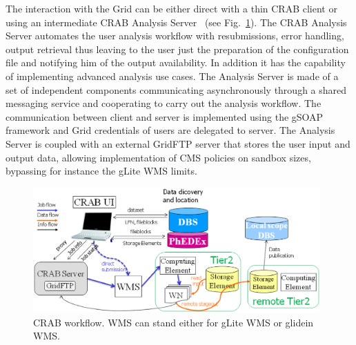 The interaction with the Grid can be either direct with a thin CRAB client or using an intermediate CRAB Analysis Server~\cite{RefCRAB} (see Fig.~\ref{fig:CRABWorkflow}). The CRAB Analysis Server automates the user analysis workflow with resubmissions, error handling, output retrieval thus leaving to the user just the preparation of the configuration file and notifying him of the output availability. In addition it has the capability of implementing advanced analysis use cases.
The Analysis Server is made of a set of independent components communicating asynchronously through a shared messaging service and cooperating to carry out the analysis workflow. The communication between client and server is implemented using the gSOAP framework and Grid credentials of users are delegated to server.
The Analysis Server is coupled with an external GridFTP server %
 that stores the user input and output data, allowing implementation of CMS policies on sandbox sizes, bypassing for instance the gLite WMS limits.


\begin{figure}
 \includegraphics[width=0.98\textwidth]{CRABWorkflow.eps}
\caption{CRAB workflow. WMS can stand either for gLite WMS or glidein WMS.}
\label{fig:CRABWorkflow}
\end{figure}

